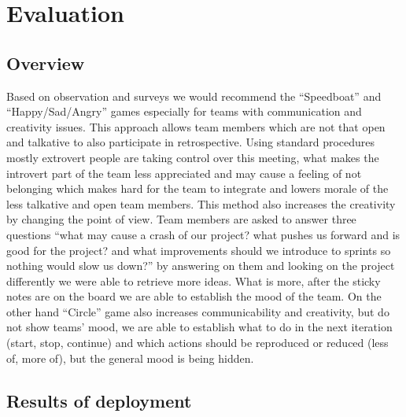 \chapter{Evaluation}
\section{Overview}
Based on observation and surveys we would recommend the “Speedboat” and “Happy/Sad/Angry” games especially for teams with communication and creativity issues. This approach allows team members which are not that open and talkative to also participate in retrospective. Using standard procedures mostly extrovert people are taking control over this meeting, what makes the introvert part of the team less appreciated and may cause a feeling of not belonging which makes hard for the team to integrate and lowers morale of the less talkative and open team members. This method also increases the creativity by changing the point of view. Team members are asked to answer three questions “what may cause a crash of our project? what pushes us forward and is good for the project? and what improvements should we introduce to sprints so nothing would slow us down?” by answering on them and looking on the project differently we were able to retrieve more ideas. What is more, after the sticky notes are on the board we are able to establish the mood of the team.
On the other hand “Circle” game also increases communicability and creativity, but do not show teams’ mood, we are able to establish what to do in the next iteration (start, stop, continue) and which actions should be reproduced or reduced (less of, more of), but the general mood is being hidden.
\section{Results of deployment}